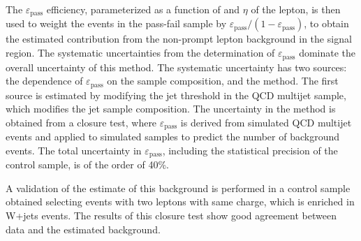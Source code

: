 The $\varepsilon_\mathrm{pass}$ efficiency, parameterized as a function of \pt and $\eta$ of the lepton, is then used to weight the events in the pass-fail sample by $\varepsilon_\mathrm{pass}/(1-\varepsilon_\mathrm{pass})$, to obtain the estimated contribution from the non-prompt lepton background in the signal region. The systematic uncertainties from the determination of $\varepsilon_\mathrm{pass}$ dominate the overall uncertainty of this method. The systematic uncertainty has two sources:  the dependence of $\varepsilon_\mathrm{pass}$ on the sample composition, and the method. The first source is estimated by modifying the jet \pt threshold in the QCD multijet sample, which modifies the jet sample composition.  The uncertainty in the method is obtained from a closure test, where $\varepsilon_\mathrm{pass}$ is derived from simulated QCD multijet events and applied to simulated samples to predict the number of background events. The total uncertainty in $\varepsilon_\mathrm{pass}$,  including the statistical precision of the control sample, is of the order of 40\%.

A validation of the estimate of this background is performed in a control sample obtained selecting events with two leptons with same charge, which is enriched in W+jets events. The results of this closure test show good agreement between data and the estimated background.

